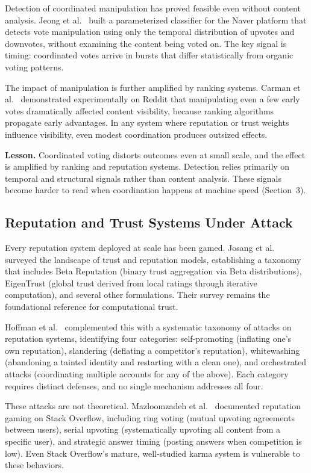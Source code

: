 \documentclass[11pt]{article}
\begin{document}
Detection of coordinated manipulation has proved feasible even without content analysis. Jeong et al.~\cite{jeong2020} built a parameterized classifier for the Naver platform that detects vote manipulation using only the temporal distribution of upvotes and downvotes, without examining the content being voted on. The key signal is timing: coordinated votes arrive in bursts that differ statistically from organic voting patterns.

The impact of manipulation is further amplified by ranking systems. Carman et al.~\cite{carman2018} demonstrated experimentally on Reddit that manipulating even a few early votes dramatically affected content visibility, because ranking algorithms propagate early advantages. In any system where reputation or trust weights influence visibility, even modest coordination produces outsized effects.

\textbf{Lesson.} Coordinated voting distorts outcomes even at small scale, and the effect is amplified by ranking and reputation systems. Detection relies primarily on temporal and structural signals rather than content analysis. These signals become harder to read when coordination happens at machine speed (Section~3).

\subsection{Reputation and Trust Systems Under Attack}

Every reputation system deployed at scale has been gamed. Josang et al.~\cite{josang2007} surveyed the landscape of trust and reputation models, establishing a taxonomy that includes Beta Reputation (binary trust aggregation via Beta distributions), EigenTrust (global trust derived from local ratings through iterative computation), and several other formulations. Their survey remains the foundational reference for computational trust.

Hoffman et al.~\cite{hoffman2009} complemented this with a systematic taxonomy of attacks on reputation systems, identifying four categories: self-promoting (inflating one's own reputation), slandering (deflating a competitor's reputation), whitewashing (abandoning a tainted identity and restarting with a clean one), and orchestrated attacks (coordinating multiple accounts for any of the above). Each category requires distinct defenses, and no single mechanism addresses all four.

These attacks are not theoretical. Mazloomzadeh et al.~\cite{mazloomzadeh2021} documented reputation gaming on Stack Overflow, including ring voting (mutual upvoting agreements between users), serial upvoting (systematically upvoting all content from a specific user), and strategic answer timing (posting answers when competition is low). Even Stack Overflow's mature, well-studied karma system is vulnerable to these behaviors.
\end{document}
